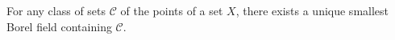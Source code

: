 For any class of sets $\mathcal{C}$ of the points of a set $X$, there exists a unique smallest Borel field containing $\mathcal{C}$.
